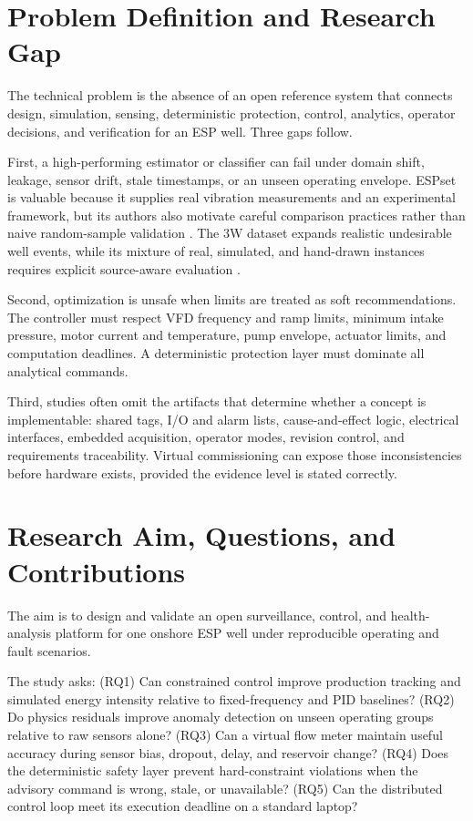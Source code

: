 \documentclass[conference]{IEEEtran}
\begin{document}
\section{Problem Definition and Research Gap}
The technical problem is the absence of an open reference system that connects design, simulation, sensing, deterministic protection, control, analytics, operator decisions, and verification for an ESP well. Three gaps follow.

First, a high-performing estimator or classifier can fail under domain shift, leakage, sensor drift, stale timestamps, or an unseen operating envelope. ESPset is valuable because it supplies real vibration measurements and an experimental framework, but its authors also motivate careful comparison practices rather than naive random-sample validation \cite{varejao2024}. The 3W dataset expands realistic undesirable well events, while its mixture of real, simulated, and hand-drawn instances requires explicit source-aware evaluation \cite{vargas2026}.

Second, optimization is unsafe when limits are treated as soft recommendations. The controller must respect VFD frequency and ramp limits, minimum intake pressure, motor current and temperature, pump envelope, actuator limits, and computation deadlines. A deterministic protection layer must dominate all analytical commands.

Third, studies often omit the artifacts that determine whether a concept is implementable: shared tags, I/O and alarm lists, cause-and-effect logic, electrical interfaces, embedded acquisition, operator modes, revision control, and requirements traceability. Virtual commissioning can expose those inconsistencies before hardware exists, provided the evidence level is stated correctly.

\section{Research Aim, Questions, and Contributions}
The aim is to design and validate an open surveillance, control, and health-analysis platform for one onshore ESP well under reproducible operating and fault scenarios.

The study asks: (RQ1) Can constrained control improve production tracking and simulated energy intensity relative to fixed-frequency and PID baselines? (RQ2) Do physics residuals improve anomaly detection on unseen operating groups relative to raw sensors alone? (RQ3) Can a virtual flow meter maintain useful accuracy during sensor bias, dropout, delay, and reservoir change? (RQ4) Does the deterministic safety layer prevent hard-constraint violations when the advisory command is wrong, stale, or unavailable? (RQ5) Can the distributed control loop meet its execution deadline on a standard laptop?
\end{document}
